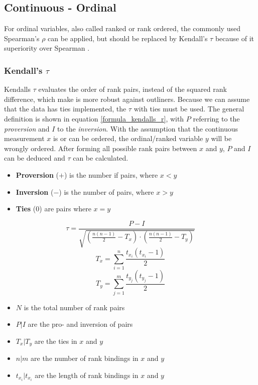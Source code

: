 \documentclass[a4paper,12pt]{report}
\begin{document}
\subsection{Continuous - Ordinal}
For ordinal variables, also called ranked or rank ordered, the commonly used Spearman's $\rho$ can be applied, but should be replaced by Kendall's $\tau$ because of it superiority over Spearman \cite{Newson2002}. 

\subsubsection{Kendall's $\tau$}
Kendalls $\tau$ evaluates the order of rank pairs, instead of the squared rank difference, which make is more robust against outliners. Because we can assume that the data has ties implemented, the $\tau$ with ties must be used. The general definition is shown in equation \ref{formula_kendalls_r}, with $P$ referring to the \textit{proversion} and $I$ to the \textit{inversion}. With the assumption that the continuous measurement $x$ is or can be ordered, the ordinal/ranked variable $y$ will be wrongly ordered. After forming all possible rank pairs between $x$ and $y$, $P$ and $I$ can be deduced and $\tau$ can be calculated. \cite{Reiter2015,Bossart2017}

\begin{itemize}	
	\item[] \textbf{Proversion} ($+$) is the number if pairs, where $x < y$ 
	\item[] \textbf{Inversion} ($-$) is the number of pairs, where $x > y$ 
	\item[] \textbf{Ties} ($0$) are pairs where $x = y$
\end{itemize}

\begin{equation}
\label{formula_kendalls_r}
	\tau = \frac{P-I}{\sqrt{(\frac{n(n-1)}{2}-T_x) \cdot (\frac{n(n-1)}{2}-T_y)}}
\end{equation}
\begin{equation}
\label{formula_kendalls_r}
	T_x = \sum_{i=1}^n \frac{t_{x_i}(t_{x_i}-1)}{2}
\end{equation}
\begin{equation}
\label{formula_kendalls_r}
	T_y = \sum_{j=1}^m \frac{t_{y_j}(t_{y_j}-1)}{2}
\end{equation}
\smallskip

\begin{itemize}
	\setlength\itemsep{0.1em}	
	\item[] $N$ is the total number of rank pairs 
	\item[] $P | I$ are the pro- and inversion of pairs
	\item[] $T_x | T_y$ are the ties in $x$ and $y$
	\item[] $n | m$ are the number of rank bindings in $x$ and $y$
	\item[] $t_{x_i} | t_{x_i}$ are the length of rank bindings in $x$ and $y$
\end{itemize}
\end{document}
